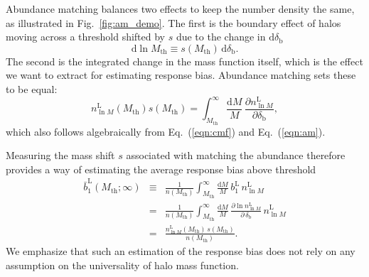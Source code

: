 \documentclass[prd,twocolumn,amsmath,amssymb,floatfix,superscriptaddress]{revtex4-1}
\newcommand{\br}{\textrm{b}}
\newcommand{\Lr}{\textrm{L}}
\newcommand{\dr}{\mathrm{d}}
\newcommand{\Mth}{{M_\textrm{th}}}
\newcommand{\lnM}{{\ln\!M}}
\begin{document}
 Abundance matching balances two effects to keep the number density the same,
as illustrated in Fig.~\ref{fig:am_demo}.
The first is the boundary effect of halos moving across a  threshold shifted by $s$ due to the
change in $\dr \delta_\br$
\begin{equation}
    \dr\ln\!\Mth \equiv s(\Mth) \, \dr\delta_\br.
    \label{eqn:ms}
\end{equation}
The second is the integrated change in the mass function itself, which is the 
effect we want to extract for estimating response bias.   Abundance matching sets these
to be equal:
\begin{equation}
    n_\lnM^\Lr(\Mth)  s(\Mth) =
    \int_\Mth^\infty\!\! \frac{\dr M}{M} \, \frac{\partial n_\lnM^\Lr}{\partial\delta_\br},
    \label{eqn:am_demo}
\end{equation}
which also follows algebraically from Eq.~(\ref{eqn:cmf}) and Eq.~(\ref{eqn:am}).

Measuring the mass shift $s$ associated with matching the abundance therefore provides
 a way of estimating the average response bias above
threshold
\begin{eqnarray}
 \bar b_1^\Lr(\Mth;\infty) &\equiv & \frac{1}{n(\Mth)} 
\int_\Mth^\infty\!\! \frac{\dr M}{M} \,
    b_1^\Lr \,n_\lnM^\Lr \nonumber\\
    &=& \frac{1}{n(\Mth)} 
\int_\Mth^\infty\!\! \frac{\dr M}{M} \,
    \frac{\partial \ln n_\lnM^\Lr}{\partial \,\delta_\br}  \,n_\lnM^\Lr  \nonumber\\
    &=& \frac{n_\lnM^\Lr(\Mth) \,  s(\Mth)}{n(\Mth)}.
    \label{eqn:b1Mres}
\end{eqnarray}
 We emphasize that such an estimation of the response bias does not rely on any
assumption on the universality of halo mass function.
\end{document}
